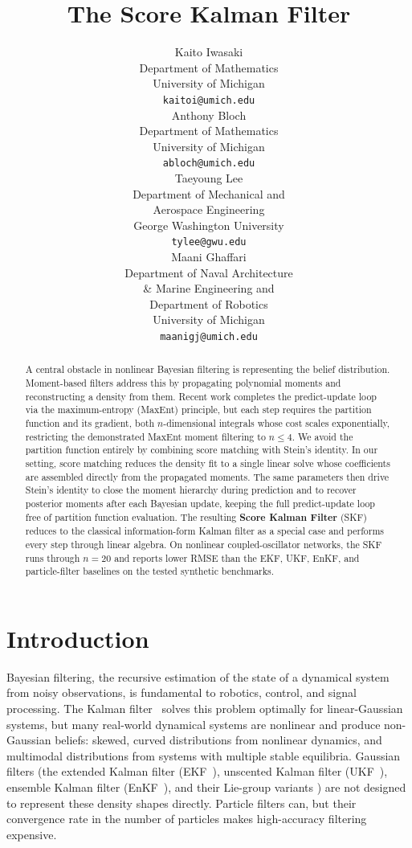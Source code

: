 \documentclass{article}
\title{The Score Kalman Filter}
\author{%
  Kaito Iwasaki \\
  Department of Mathematics \\
  University of Michigan \\
  \texttt{kaitoi@umich.edu} \\
  \And
  Anthony Bloch \\
  Department of Mathematics \\
  University of Michigan \\
  \texttt{abloch@umich.edu} \\
  \And
  Taeyoung Lee \\
  Department of Mechanical and \\
  Aerospace Engineering \\
  George Washington University \\
  \texttt{tylee@gwu.edu} \\
  \And
  Maani Ghaffari \\
  Department of Naval Architecture \\
  \& Marine Engineering and \\
  Department of Robotics \\
  University of Michigan \\
  \texttt{maanigj@umich.edu} \\
}
\theoremstyle{definition}
\begin{document}
\maketitle

\begin{abstract}
A central obstacle in nonlinear Bayesian filtering is representing the belief distribution. Moment-based filters address this by propagating polynomial moments and reconstructing a density from them. Recent work completes the predict-update loop via the maximum-entropy (MaxEnt) principle, but each step requires the partition function and its gradient, both $n$-dimensional integrals whose cost scales exponentially, restricting the demonstrated MaxEnt moment filtering to $n \le 4$. We avoid the partition function entirely by combining score matching with Stein's identity. In our setting, score matching reduces the density fit to a single linear solve whose coefficients are assembled directly from the propagated moments. The same parameters then drive Stein's identity to close the moment hierarchy during prediction and to recover posterior moments after each Bayesian update, keeping the full predict-update loop free of partition function evaluation. The resulting \textbf{Score Kalman Filter} (SKF) reduces to the classical information-form Kalman filter as a special case and performs every step through linear algebra. On nonlinear coupled-oscillator networks, the SKF runs through $n=20$ and reports lower RMSE than the EKF, UKF, EnKF, and particle-filter baselines on the tested synthetic benchmarks.
\end{abstract}

\section{Introduction}

Bayesian filtering, the recursive estimation of the state of a dynamical system
from noisy observations, is fundamental to robotics, control, and
signal processing.
The Kalman filter~\cite{kalman1960} solves this problem optimally for
linear-Gaussian systems, but many real-world dynamical systems are nonlinear and produce
non-Gaussian beliefs: skewed, curved distributions from nonlinear dynamics, and multimodal distributions from systems with multiple stable equilibria.
Gaussian filters (the extended Kalman filter
(EKF~\cite{schmidt1966,jazwinski1970}), unscented Kalman filter
(UKF~\cite{julier1997,wan2000}), ensemble Kalman filter
(EnKF~\cite{evensen1994,burgers1998}), and their Lie-group variants
\cite{barrau2017,brossard2020}) are not designed to represent these
density shapes directly.
Particle filters can, but their convergence rate in the number of
particles makes high-accuracy filtering expensive.
\end{document}
